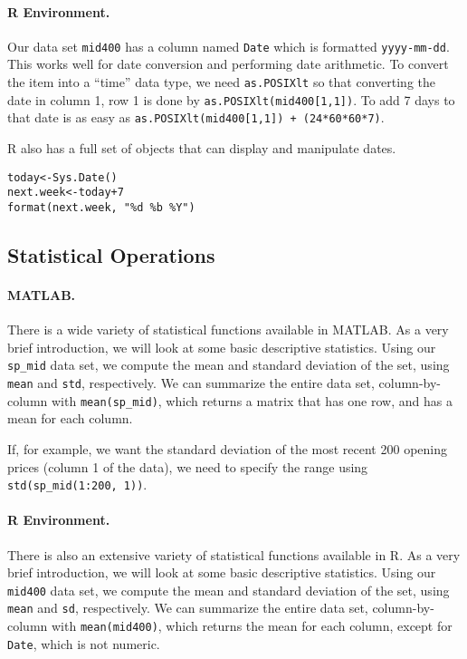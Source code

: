 \paragraph{R Environment.} Our data set \texttt{mid400} has a column named \texttt{Date} which is formatted \texttt{yyyy-mm-dd}. This works well for date conversion and performing date arithmetic. To convert the item into a ``time'' data type, we need \texttt{as.POSIXlt} 
so that converting the date in column 1, row 1 is done by \texttt{as.POSIXlt(mid400[1,1])}. To add 7 days to that date is as easy as \texttt{as.POSIXlt(mid400[1,1]) + (24*60*60*7)}.

R also has a full set of objects that can display and manipulate dates.
\begin{verbatim}
today<-Sys.Date()
next.week<-today+7
format(next.week, "%d %b %Y")
\end{verbatim}

\subsection{Statistical Operations}
\paragraph{MATLAB.}
There is a wide variety of statistical functions available in MATLAB. As a very brief introduction, we will look at some basic descriptive statistics. Using our \texttt{sp\_mid} data set, we compute the mean and standard deviation of the set, using \texttt{mean} and \texttt{std}, respectively. We can summarize the entire data set, column-by-column with \texttt{mean(sp\_mid)}, which returns a matrix that has one row, and has a mean for each column.

If, for example, we want the standard deviation of the most recent 200 opening prices (column 1 of the data), we need to specify the range using \texttt{std(sp\_mid(1:200, 1))}.

\paragraph{R Environment.}
There is also an extensive variety of statistical functions available in R. As a very brief introduction, we will look at some basic descriptive statistics. Using our \texttt{mid400} data set, we compute the mean and standard deviation of the set, using \texttt{mean} and \texttt{sd}, respectively. We can summarize the entire data set, column-by-column with \texttt{mean(mid400)}, which returns the mean for each column, except for \texttt{Date}, which is not numeric.

